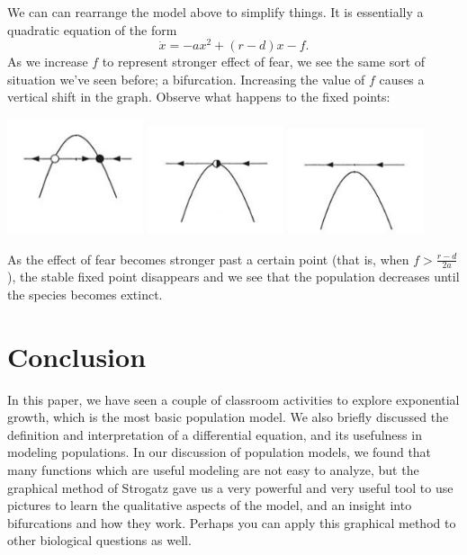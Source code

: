 \documentclass[man, 12pt]{apa6}
\begin{document}
We can can rearrange the model above to simplify things. It is essentially a quadratic equation of the form 
$$\dot{x}=-ax^2+(r-d)x-f.$$
As we increase $f$ to represent stronger effect of fear, we see the same sort of situation we've seen before; a bifurcation. Increasing the value of $f$ causes a vertical shift in the graph. Observe what happens to the fixed points:
\begin{center}
\includegraphics[width=0.3\textwidth]{stro_fig_3-1-1_rev_a}
\includegraphics[width=0.3\textwidth]{stro_fig_3-1-1_rev_b}
\includegraphics[width=0.3\textwidth]{stro_fig_3-1-1_rev_c}
\end{center}
As the effect of fear becomes stronger past a certain point (that is, when $f>\frac{r-d}{2a}$), the stable fixed point disappears and we see that the population decreases until the species becomes extinct.

\section{Conclusion} 
In this paper, we have seen a couple of classroom activities to explore exponential growth, which is the most basic population model. We also briefly discussed the definition and interpretation of a differential equation, and its usefulness in modeling populations. In our discussion of population models, we found that many functions which are useful modeling are not easy to analyze, but the graphical method of Strogatz gave us a very powerful and  very useful tool to use pictures to learn the qualitative aspects of the model, and an insight into bifurcations and how they work. Perhaps you can apply this graphical method to other biological questions as well.
\printbibliography
\end{document}
